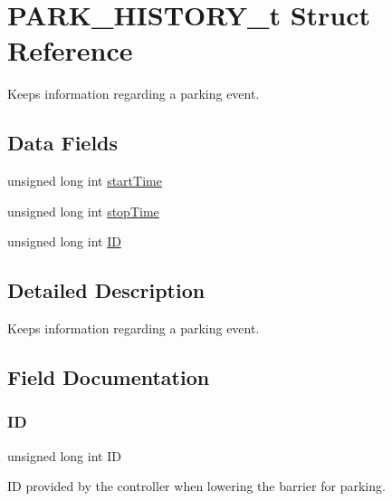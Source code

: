 \hypertarget{struct_p_a_r_k___h_i_s_t_o_r_y__t}{}\section{P\+A\+R\+K\+\_\+\+H\+I\+S\+T\+O\+R\+Y\+\_\+t Struct Reference}
\label{struct_p_a_r_k___h_i_s_t_o_r_y__t}


Keeps information regarding a parking event.  


\subsection*{Data Fields}
\begin{DoxyCompactItemize}
\item 
unsigned long int \hyperlink{struct_p_a_r_k___h_i_s_t_o_r_y__t_aade9106de388a9e2a128cfa620d09172}{start\+Time}
\item 
unsigned long int \hyperlink{struct_p_a_r_k___h_i_s_t_o_r_y__t_ade4f9c9fdf82d667d8ce275da9dde4e6}{stop\+Time}
\item 
unsigned long int \hyperlink{struct_p_a_r_k___h_i_s_t_o_r_y__t_accee52dc80b85d018c415ea575c918ba}{ID}
\end{DoxyCompactItemize}


\subsection{Detailed Description}
Keeps information regarding a parking event. 

\subsection{Field Documentation}
\mbox{\label{struct_p_a_r_k___h_i_s_t_o_r_y__t_accee52dc80b85d018c415ea575c918ba}} 
\subsubsection{\texorpdfstring{ID}{ID}}
{\footnotesize\ttfamily unsigned long int ID}

ID provided by the controller when lowering the barrier for parking. \mbox{\label{struct_p_a_r_k___h_i_s_t_o_r_y__t_aade9106de388a9e2a128cfa620d09172}} 

